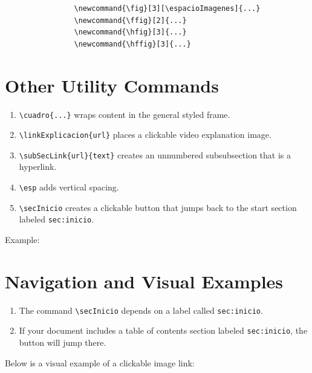 \begin{minipage}{\anchoPag}
		\begin{mdframed}[style=code]
			\begin{verbatim}
				\newcommand{\fig}[3][\espacioImagenes]{...}
				\newcommand{\ffig}[2]{...}
				\newcommand{\hfig}[3]{...}
				\newcommand{\hffig}[3]{...}
			\end{verbatim}
		\end{mdframed}
		
		\section{Other Utility Commands}\label{sec:other}
		
		\begin{enumerate}
			\item \texttt{\textbackslash cuadro\{...\}} wraps content in the general styled frame.
			\item \texttt{\textbackslash linkExplicacion\{url\}} places a clickable video explanation image.
			\item \texttt{\textbackslash subSecLink\{url\}\{text\}} creates an unnumbered subsubsection that is a hyperlink.
			\item \texttt{\textbackslash esp} adds vertical spacing.
			\item \texttt{\textbackslash secInicio} creates a clickable button that jumps back to the start section labeled \texttt{sec:inicio}.
		\end{enumerate}
		
		\begin{mdframed}[style=estiloGeneral]
			Example:
			
			
			\esp
			
		\end{mdframed}
		
		\section{Navigation and Visual Examples}\label{sec:navigation}
		
		\begin{enumerate}
			\item The command \texttt{\textbackslash secInicio} depends on a label called \texttt{sec:inicio}.
			\item If your document includes a table of contents section labeled \texttt{sec:inicio}, the button will jump there.
		\end{enumerate}
		
		\begin{mdframed}[style=estiloGeneral]
			Below is a visual example of a clickable image link:
			
		\end{mdframed}
		
		\secInicio
		
	\end{minipage}

